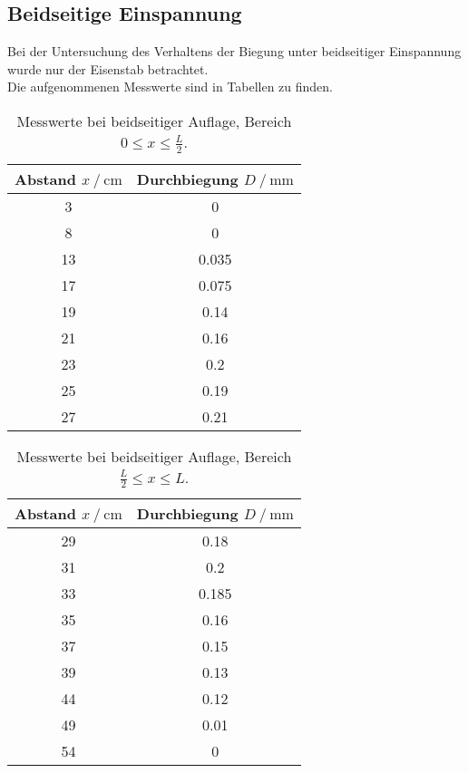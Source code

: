 \subsection{Beidseitige Einspannung}
  Bei der Untersuchung des Verhaltens der Biegung unter beidseitiger Einspannung wurde nur der 
  Eisenstab betrachtet. \\
  Die aufgenommenen Messwerte sind in Tabellen zu finden. %

  \begin{table}
    \centering
    \caption{Messwerte bei beidseitiger Auflage, Bereich $0 \leq x \leq \frac{L}{2}$.}
    \label{tab:rechts}
    \begin{tabular}{c c}
      \toprule
      Abstand $x \mathbin{/} \si{\centi\m}$ & Durchbiegung $D \mathbin{/} \si{\milli\m}$ \\
      \midrule
      3  & 0\\
      8  & 0\\
      13 & 0.035\\
      17 & 0.075\\
      19 & 0.14\\
      21 & 0.16\\
      23 & 0.2\\
      25 & 0.19\\
      27 & 0.21\\
      \bottomrule
    \end{tabular}
  \end{table}

  \begin{table}
    \centering
    \caption{Messwerte bei beidseitiger Auflage, Bereich $\frac{L}{2} \leq x \leq L$.}
    \label{tab:links}
    \begin{tabular}{c c}
      \toprule
      Abstand $x \mathbin{/} \si{\centi\m}$ & Durchbiegung $D \mathbin{/} \si{\milli\m}$ \\
      \midrule
      29 & 0.18\\
      31 & 0.2\\
      33 & 0.185\\
      35 & 0.16\\
      37 & 0.15\\
      39 & 0.13\\
      44 & 0.12\\
      49 & 0.01\\
      54 & 0\\
      \bottomrule
    \end{tabular}
  \end{table}
  \FloatBarrier

